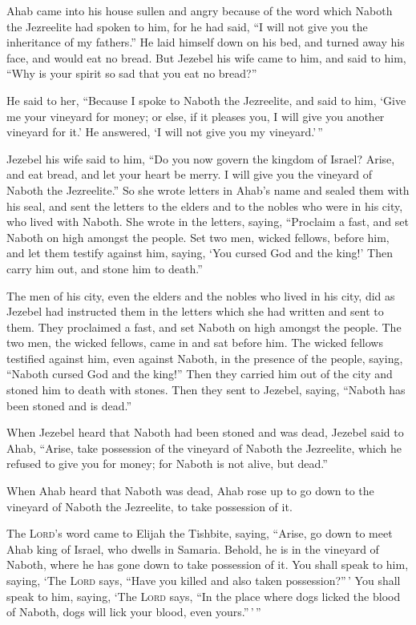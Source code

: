 Ahab came into his house sullen and angry because of the
word which Naboth the Jezreelite had spoken to him, for he had said, ``I
will not give you the inheritance of my fathers.'' He laid himself down
on his bed, and turned away his face, and would eat no bread.
 But Jezebel his wife came to him, and said to him, ``Why
is your spirit so sad that you eat no bread?''

 He said to her, ``Because I spoke to Naboth the
Jezreelite, and said to him, `Give me your vineyard for money; or else,
if it pleases you, I will give you another vineyard for it.' He
answered, `I will not give you my vineyard.'\,''

 Jezebel his wife said to him, ``Do you now govern the
kingdom of Israel? Arise, and eat bread, and let your heart be merry. I
will give you the vineyard of Naboth the Jezreelite.''  So
she wrote letters in Ahab's name and sealed them with his seal, and sent
the letters to the elders and to the nobles who were in his city, who
lived with Naboth.  She wrote in the letters, saying,
``Proclaim a fast, and set Naboth on high amongst the people.
 Set two men, wicked fellows, before him, and let them
testify against him, saying, `You cursed God and the king!' Then carry
him out, and stone him to death.''

 The men of his city, even the elders and the nobles who
lived in his city, did as Jezebel had instructed them in the letters
which she had written and sent to them.  They proclaimed
a fast, and set Naboth on high amongst the people.  The
two men, the wicked fellows, came in and sat before him. The wicked
fellows testified against him, even against Naboth, in the presence of
the people, saying, ``Naboth cursed God and the king!'' Then they
carried him out of the city and stoned him to death with stones.
 Then they sent to Jezebel, saying, ``Naboth has been
stoned and is dead.''

 When Jezebel heard that Naboth had been stoned and was
dead, Jezebel said to Ahab, ``Arise, take possession of the vineyard of
Naboth the Jezreelite, which he refused to give you for money; for
Naboth is not alive, but dead.''

 When Ahab heard that Naboth was dead, Ahab rose up to go
down to the vineyard of Naboth the Jezreelite, to take possession of it.

 The \textsc{Lord}'s word came to Elijah the Tishbite,
saying,  ``Arise, go down to meet Ahab king of Israel,
who dwells in Samaria. Behold, he is in the vineyard of Naboth, where he
has gone down to take possession of it.  You shall speak
to him, saying, `The \textsc{Lord} says, ``Have you killed and also
taken possession?''\,' You shall speak to him, saying, `The
\textsc{Lord} says, ``In the place where dogs licked the blood of
Naboth, dogs will lick your blood, even yours.''\,'\,''

